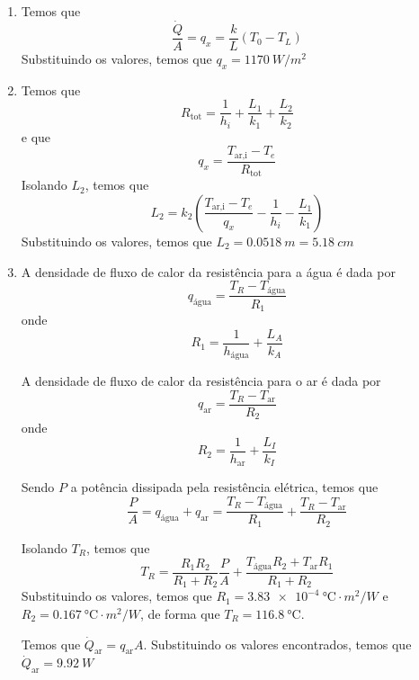 \documentclass[12pt,a4paper,brazilian]{article}
\begin{document}
\begin{enumerate}
    \item Temos que
        \[
            \frac{\dot{Q}}{A} = q_x =  \frac{k}{L}(T_0 - T_L)
        \]
        Substituindo os valores, temos que \(q_x = \SI{1170}{W/m^2}\)

    \item Temos que
        \[
            R_\text{tot} = \frac{1}{h_i} + \frac{L_1}{k_1} + \frac{L_2}{k_2}
        \]
        e que
        \[
            q_x = \frac{T_\text{ar,i} - T_e}{R_\text{tot}}
        \]
        Isolando \(L_2\), temos que
        \[
            L_2 = k_2\left(\frac{T_\text{ar,i}-T_e}{q_x}-\frac{1}{h_i}-\frac{L_1}{k_1}\right)
        \]
        Substituindo os valores, temos que \(L_2 = \SI{0.0518}{m}=\SI{5.18}{cm}\)

    \item A densidade de fluxo de calor da resistência para a água é dada por
        \[
            q_\text{água} = \frac{T_R - T_\text{água}}{R_1}
        \]
        onde
        \[
            R_1 = \frac{1}{h_\text{água}}+\frac{L_A}{k_A}
        \]

        A densidade de fluxo de calor da resistência para o ar é dada por
        \[
            q_\text{ar} = \frac{T_R - T_\text{ar}}{R_2}
        \]
        onde
        \[
            R_2 = \frac{1}{h_\text{ar}}+\frac{L_I}{k_I}
        \]

        Sendo \(P\) a potência dissipada pela resistência elétrica, temos que
        \[
            \frac{P}{A} = q_\text{água}+q_\text{ar} = 
            \frac{T_R - T_\text{água}}{R_1}+
            \frac{T_R - T_\text{ar}}{R_2}
        \]

        Isolando \(T_R\), temos que
        \[
            T_R = \frac{R_1 R_2}{R_1+R_2}\frac{P}{A}+\frac{T_\text{água}R_2 +T_\text{ar}R_1}{R_1+R_2}
        \]
         Substituindo os valores, temos que \(R_1 = \SI{3.83e-4}{\celsius \cdot m^2/W}\) e
         \(R_2 = \SI{0.167}{\celsius \cdot m^2/W}\), de forma que \(T_R = \SI{116.8}{\celsius}\).

         Temos que \(\dot{Q}_\text{ar} = q_\text{ar}A\). Substituindo os valores encontrados, temos que
         \(\dot{Q}_\text{ar} = \SI{9.92}{W}\)


\end{enumerate}
\end{document}
